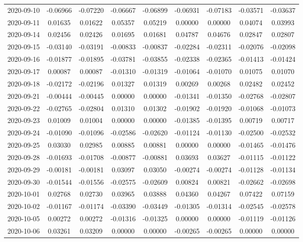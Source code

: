 {\begin{footnotesize}
\begin{longtable}{lcccccccc}
2020-09-10 & -0.06966 & -0.07220 & -0.06667 & -0.06899 & -0.06931 & -0.07183 & -0.03571 & -0.03637 \\
2020-09-11 & 0.01635 & 0.01622 & 0.05357 & 0.05219 & 0.00000 & 0.00000 & 0.04074 & 0.03993 \\
2020-09-14 & 0.02456 & 0.02426 & 0.01695 & 0.01681 & 0.04787 & 0.04676 & 0.02847 & 0.02807 \\
2020-09-15 & -0.03140 & -0.03191 & -0.00833 & -0.00837 & -0.02284 & -0.02311 & -0.02076 & -0.02098 \\
2020-09-16 & -0.01877 & -0.01895 & -0.03781 & -0.03855 & -0.02338 & -0.02365 & -0.01413 & -0.01424 \\
2020-09-17 & 0.00087 & 0.00087 & -0.01310 & -0.01319 & -0.01064 & -0.01070 & 0.01075 & 0.01070 \\
2020-09-18 & -0.02172 & -0.02196 & 0.01327 & 0.01319 & 0.00269 & 0.00268 & 0.02482 & 0.02452 \\
2020-09-21 & -0.00444 & -0.00445 & 0.00000 & 0.00000 & -0.01341 & -0.01350 & -0.02768 & -0.02807 \\
2020-09-22 & -0.02765 & -0.02804 & 0.01310 & 0.01302 & -0.01902 & -0.01920 & -0.01068 & -0.01073 \\
2020-09-23 & 0.01009 & 0.01004 & 0.00000 & 0.00000 & -0.01385 & -0.01395 & 0.00719 & 0.00717 \\
2020-09-24 & -0.01090 & -0.01096 & -0.02586 & -0.02620 & -0.01124 & -0.01130 & -0.02500 & -0.02532 \\
2020-09-25 & 0.03030 & 0.02985 & 0.00885 & 0.00881 & 0.00000 & 0.00000 & -0.01465 & -0.01476 \\
2020-09-28 & -0.01693 & -0.01708 & -0.00877 & -0.00881 & 0.03693 & 0.03627 & -0.01115 & -0.01122 \\
2020-09-29 & -0.00181 & -0.00181 & 0.03097 & 0.03050 & -0.00274 & -0.00274 & -0.01128 & -0.01134 \\
2020-09-30 & -0.01544 & -0.01556 & -0.02575 & -0.02609 & 0.00824 & 0.00821 & -0.02662 & -0.02698 \\
2020-10-01 & 0.02768 & 0.02730 & 0.03965 & 0.03888 & 0.04360 & 0.04267 & 0.07422 & 0.07159 \\
2020-10-02 & -0.01167 & -0.01174 & -0.03390 & -0.03449 & -0.01305 & -0.01314 & -0.02545 & -0.02578 \\
2020-10-05 & 0.00272 & 0.00272 & -0.01316 & -0.01325 & 0.00000 & 0.00000 & -0.01119 & -0.01126 \\
2020-10-06 & 0.03261 & 0.03209 & 0.00000 & 0.00000 & -0.00265 & -0.00265 & 0.00000 & 0.00000 \\

\end{longtable}
\end{footnotesize}}
